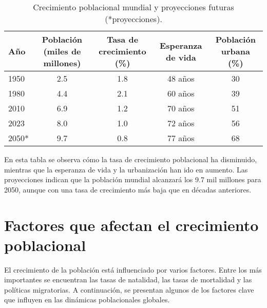 \begin{table}[h]
\centering
\begin{tabular}{@{}lcccc@{}}
\toprule
\textbf{Año} & \textbf{Población (miles de millones)} & \textbf{Tasa de crecimiento (\%)} & \textbf{Esperanza de vida} & \textbf{Población urbana (\%)} \\ \midrule
1950        & 2.5                                  & 1.8                            & 48 años                    & 30                              \\
1980        & 4.4                                  & 2.1                            & 60 años                    & 39                              \\
2010        & 6.9                                  & 1.2                            & 70 años                    & 51                              \\
2023        & 8.0                                  & 1.0                            & 72 años                    & 56                              \\
2050*       & 9.7                                  & 0.8                            & 77 años                    & 68                              \\ \bottomrule
\end{tabular}
\caption{Crecimiento poblacional mundial y proyecciones futuras (*proyecciones).}
\label{tabla1}
\end{table}

En esta tabla se observa cómo la tasa de crecimiento poblacional ha disminuido, mientras que la esperanza de vida y la urbanización han ido en aumento. Las proyecciones indican que la población mundial alcanzará los 9.7 mil millones para 2050, aunque con una tasa de crecimiento más baja que en décadas anteriores.

\section{Factores que afectan el crecimiento poblacional}

El crecimiento de la población está influenciado por varios factores. Entre los más importantes se encuentran las tasas de natalidad, las tasas de mortalidad y las políticas migratorias. A continuación, se presentan algunos de los factores clave que influyen en las dinámicas poblacionales globales.

